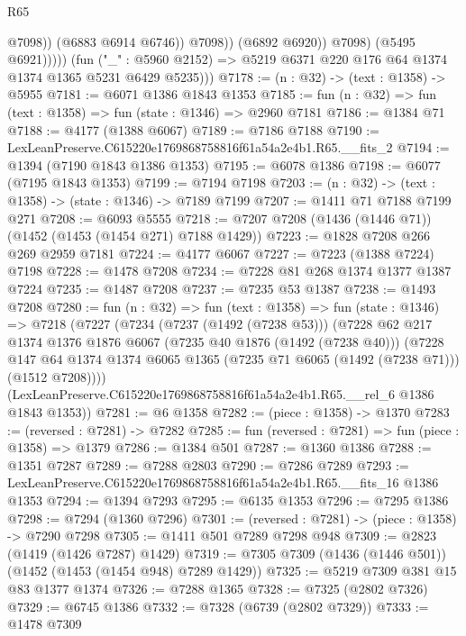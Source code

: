 \begin{lexlean}{R65}
\begin{coremodule}
                              @7098))
                          (@6883 @6914 @6746))
                        @7098))
                    (@6892 @6920))
                  @7098)
                (@5495 @6921)))))
        (fun ("_" : @5960 @2152) => @5219 @6371 @220 @176 @64 @1374 @1374 @1365 @5231 @6429 @5235)))
@7178 := (n : @32) -> (text : @1358) -> @5955
@7181 := @6071 @1386 @1843 @1353
@7185 := fun (n : @32) => fun (text : @1358) => fun (state : @1346) => @2960 @7181
@7186 := @1384 @71
@7188 := @4177 (@1388 @6067)
@7189 := @7186 @7188
@7190 := LexLeanPreserve.C615220e1769868758816f61a54a2e4b1.R65.__fits_2
@7194 := @1394 (@7190 @1843 @1386 @1353)
@7195 := @6078 @1386
@7198 := @6077 (@7195 @1843 @1353)
@7199 := @7194 @7198
@7203 := (n : @32) -> (text : @1358) -> (state : @1346) -> @7189 @7199
@7207 := @1411 @71 @7188 @7199 @271
@7208 := @6093 @5555
@7218 := @7207 @7208 (@1436 (@1446 @71)) (@1452 (@1453 (@1454 @271) @7188 @1429))
@7223 := @1828 @7208 @266 @269 @2959 @7181
@7224 := @4177 @6067
@7227 := @7223 (@1388 @7224) @7198
@7228 := @1478 @7208
@7234 := @7228 @81 @268 @1374 @1377 @1387 @7224
@7235 := @1487 @7208
@7237 := @7235 @53 @1387
@7238 := @1493 @7208
@7280 := fun (n : @32) =>
  fun (text : @1358) =>
  fun (state : @1346) =>
  @7218
    (@7227
      (@7234
        (@7237 (@1492 (@7238 @53)))
        (@7228
          @62
          @217
          @1374
          @1376
          @1876
          @6067
          (@7235 @40 @1876 (@1492 (@7238 @40)))
          (@7228
            @147
            @64
            @1374
            @1374
            @6065
            @1365
            (@7235 @71 @6065 (@1492 (@7238 @71)))
            (@1512 @7208))))
      (LexLeanPreserve.C615220e1769868758816f61a54a2e4b1.R65.__rel_6 @1386 @1843 @1353))
@7281 := @6 @1358
@7282 := (piece : @1358) -> @1370
@7283 := (reversed : @7281) -> @7282
@7285 := fun (reversed : @7281) => fun (piece : @1358) => @1379
@7286 := @1384 @501
@7287 := @1360 @1386
@7288 := @1351 @7287
@7289 := @7288 @2803
@7290 := @7286 @7289
@7293 := LexLeanPreserve.C615220e1769868758816f61a54a2e4b1.R65.__fits_16 @1386 @1353
@7294 := @1394 @7293
@7295 := @6135 @1353
@7296 := @7295 @1386
@7298 := @7294 (@1360 @7296)
@7301 := (reversed : @7281) -> (piece : @1358) -> @7290 @7298
@7305 := @1411 @501 @7289 @7298 @948
@7309 := @2823 (@1419 (@1426 @7287) @1429)
@7319 := @7305 @7309 (@1436 (@1446 @501)) (@1452 (@1453 (@1454 @948) @7289 @1429))
@7325 := @5219 @7309 @381 @15 @83 @1377 @1374
@7326 := @7288 @1365
@7328 := @7325 (@2802 @7326)
@7329 := @6745 @1386
@7332 := @7328 (@6739 (@2802 @7329))
@7333 := @1478 @7309

\end{coremodule}
\end{lexlean}
